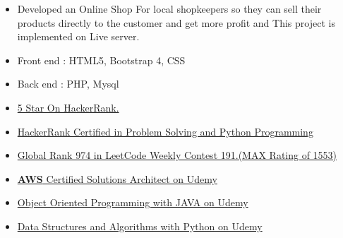 \documentclass[10pt,a4paper,ragged2e]{altacv}
\begin{document}
\divider

\begin{itemize}
\item Developed an Online Shop For local shopkeepers so they can sell their products directly to the customer and get more profit and This project is implemented on Live server.
\smallskip
\item Front end : HTML5, Bootstrap 4, CSS
\item Back end : PHP, Mysql
\smallskip
    \smallskip
\end{itemize}



\smallskip
\begin{itemize}
\item \href{https://www.hackerrank.com/Jaydeep9979}{5 Star On HackerRank.}
\smallskip
\item \href{https://leetcode.com/jaydeep9979/}{HackerRank Certified in Problem Solving and Python Programming} 
      \smallskip
\item \href{https://leetcode.com/jaydeep9979/}{Global Rank 974 in LeetCode Weekly Contest 191.(MAX Rating of 1553)}

\end{itemize}

\smallskip
\begin{itemize}
\item \href{}{\textbf{AWS} Certified  Solutions Architect on Udemy }
\smallskip
\item \href{}{Object Oriented Programming with JAVA on Udemy} 
      \smallskip
\item \href{}{Data Structures and Algorithms with Python on Udemy}

\end{itemize}

\clearpage


\nocite{*}






\end{document}
